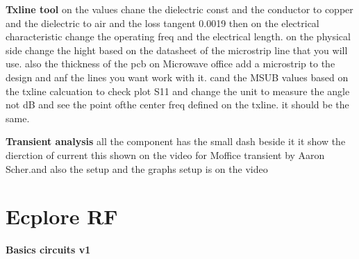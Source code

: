 \documentclass{article}
\begin{document}
\begin{itemize}
\begin{itemize}
\end{itemize}


\textbf{Txline tool}
on the  values chane the dielectric const and the conductor to copper and the dielectric to air and the loss tangent 0.0019 
then on the electrical characteristic change the operating freq and the electrical length. 
on the physical side change the hight based on the datasheet of the microstrip line that you will use. 
also the thickness of the pcb 
on Microwave office add a microstrip to the design and anf the lines you want work with it. 
cand the MSUB values based on the txline calcuation 
to check plot S11 and change the unit to measure the angle not dB and see the point ofthe center freq defined on the txline. 
it should be the same. 



\textbf{Transient analysis}
all the component has the small dash beside it it show the dierction of current this shown on the video for Moffice transient by Aaron Scher.and also the setup and the graphs setup is on the video


\section{Ecplore RF}
\textbf{Basics circuits v1 }



















\end{itemize}
\end{document}
